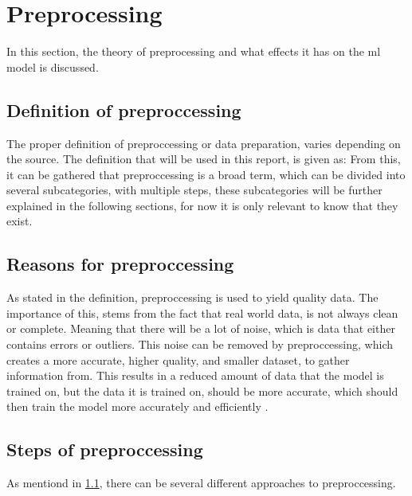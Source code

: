 \section{Preprocessing}
In this section, the theory of preprocessing and what effects it has on the \gls{ml} model is discussed. 


\subsection{Definition of preproccessing}\label{subsec:preprocessing-definition}
The proper definition of preproccessing or data preparation, varies depending on the source. The definition that will be used in this report, is given as:
From this, it can be gathered that preproccessing is a broad term, which can be divided into several subcategories, with multiple steps, these subcategories will be further explained in the following sections, for now it is only relevant to know that they exist. 

\subsection{Reasons for preproccessing}
As stated in the definition, preproccessing is used to yield quality data. The importance of this, stems from the fact that real world data, is not always clean or complete. Meaning that there will be a lot of noise, which is data that either contains errors or outliers. This noise can be removed by preproccessing, which creates a more accurate, higher quality, and smaller dataset, to gather information from. This results in a reduced amount of data that the model is trained on, but the data it is trained on, should be more accurate, which should then train the model more accurately and efficiently \cite{doi:10.1080/713827180}.

\subsection{Steps of preproccessing}
As mentiond in \ref{subsec:preprocessing-definition}, there can be several different approaches to preproccessing. 

